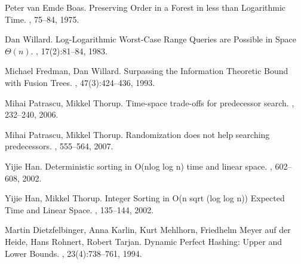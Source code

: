 \documentclass[11pt]{article}
\begin{document}


\begin{thebibliography}{42}

Peter van Emde Boas.
\newblock Preserving Order in a Forest in less than Logarithmic Time.
, 75--84, 1975.

Dan Willard.
\newblock Log-Logarithmic Worst-Case Range Queries are Possible in Space $\Theta(n)$.
, 17(2):81--84, 1983.

Michael Fredman, Dan Willard.
\newblock Surpassing the Information Theoretic Bound with Fusion Trees.
, 47(3):424--436, 1993.

Mihai Patrascu, Mikkel Thorup.
\newblock Time-space trade-offs for predecessor search.
, 232--240, 2006.

Mihai Patrascu, Mikkel Thorup.
\newblock Randomization does not help searching predecessors.
, 555--564, 2007.

Yijie Han.
\newblock Deterministic sorting in O(nlog log n) time and linear space.
, 602--608, 2002.

Yijie Han, Mikkel Thorup.
\newblock Integer Sorting in O(n sqrt (log log n)) Expected Time and Linear Space.
, 135--144, 2002.

Martin Dietzfelbinger, Anna Karlin, Kurt Mehlhorn, Friedhelm Meyer auf der Heide, Hans Rohnert, Robert Tarjan.
\newblock Dynamic Perfect Hashing: Upper and Lower Bounds.
, 23(4):738--761, 1994.

\end{thebibliography}
\end{document}
